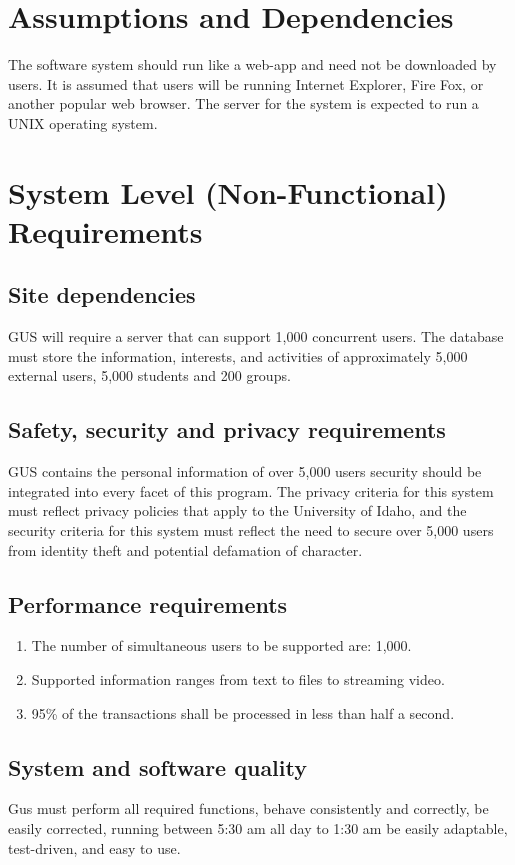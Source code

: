 \documentclass[12pt, oneside, letterpaper]{report}
\begin{document}
	\section{Assumptions and Dependencies}
		The software system should run like a web-app and need not be
		downloaded by users.  It is assumed that users will be running
		Internet Explorer, Fire Fox, or another popular web browser.
		The server for the system is expected to run a UNIX operating
		system.
	\section{System Level (Non-Functional) Requirements}
		\subsection{Site dependencies}
			GUS will require a server that can support 1,000 concurrent
			users.  The database must store the information, interests,
			and activities of approximately 5,000 external users, 5,000
			students and 200 groups.
		\subsection{Safety, security and privacy requirements}
			GUS contains the personal information of over 5,000 users
			security should be integrated into every facet of this
			program.  The privacy criteria for this system must reflect
			privacy policies that apply to the University of Idaho, and
			the security criteria for this system must reflect the need
			to secure over 5,000 users from identity theft and potential
			defamation of character.
		\subsection{Performance requirements}
		\begin{enumerate}
			\item The number of simultaneous users to be supported are: 1,000.
			\item Supported information ranges from text to files to streaming video.
			\item 95\% of the transactions shall be processed in less than half a second.
		\end{enumerate}
		\subsection{System and software quality}
			Gus must perform all required functions, behave consistently
			and correctly, be easily corrected, running between 5:30 am
			all day to 1:30 am be easily adaptable, test-driven, and easy
			to use.
\end{document}
